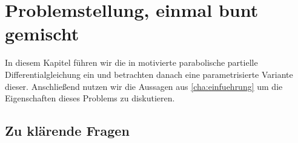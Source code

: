 
\chapter{Problemstellung, einmal bunt gemischt}

In diesem Kapitel führen wir die in \cite{Stasiak:2011ba} motivierte parabolische partielle Differentialgleichung ein und betrachten danach eine parametrisierte Variante dieser.
Anschließend nutzen wir die Aussagen aus \autoref{cha:einfuehrung} um die Eigenschaften dieses Problems zu diskutieren.

\section*{Zu klärende Fragen} %
\label{sub:zu_kl_rende_fragen}

